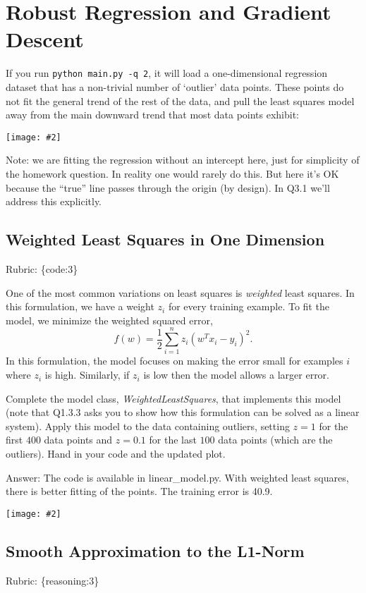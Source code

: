 \documentclass{article}
\def\rubric#1{\gre{Rubric: \{#1\}}}{}
\def\blu#1{{\color{blu}#1}}
\def\gre#1{{\color{gre}#1}}
\newcommand{\centerfig}[2]{\begin{center}\texttt{[image: \#2]}\end{center}}
\begin{document}
\section{Robust Regression and Gradient Descent}

If you run \verb|python main.py -q 2|, it will load a one-dimensional regression
dataset that has a non-trivial number of `outlier' data points.
These points do not fit the general trend of the rest of the data,
and pull the least squares model away from the main downward trend that most data points exhibit:
\centerfig{.7}{../figs/least_squares_outliers.pdf}

Note: we are fitting the regression without an intercept here, just for simplicity of the homework question.
In reality one would rarely do this. But here it's OK because the ``true'' line 
passes through the origin (by design). In Q3.1 we'll address this explicitly.

\subsection{Weighted Least Squares in One Dimension}
\rubric{code:3}

One of the most common variations on least squares is \emph{weighted} least squares. In this formulation, we have a weight $z_i$ for every training example. To fit the model, we minimize the weighted squared error,
\[
f(w) =  \frac{1}{2}\sum_{i=1}^n z_i(w^Tx_i - y_i)^2.
\]
In this formulation, the model focuses on making the error small for examples $i$ where $z_i$ is high. Similarly, if $z_i$ is low then the model allows a larger error.

Complete the model class, \emph{WeightedLeastSquares}, that implements this model
(note that Q1.3.3 asks you to show how this formulation can be solved as a linear system).
Apply this model to the data containing outliers, setting $z = 1$ for the first
$400$ data points and $z = 0.1$ for the last $100$ data points (which are the outliers).
\blu{Hand in your code and the updated plot}.

\blu{Answer:} The code is available in linear\_model.py. With weighted least squares, there is better fitting of the points. The training error is 40.9.\\
\centerfig{.7}{../figs/least_squares_outliers_weighted.pdf}

\subsection{Smooth Approximation to the L1-Norm}
\rubric{reasoning:3}
\end{document}
